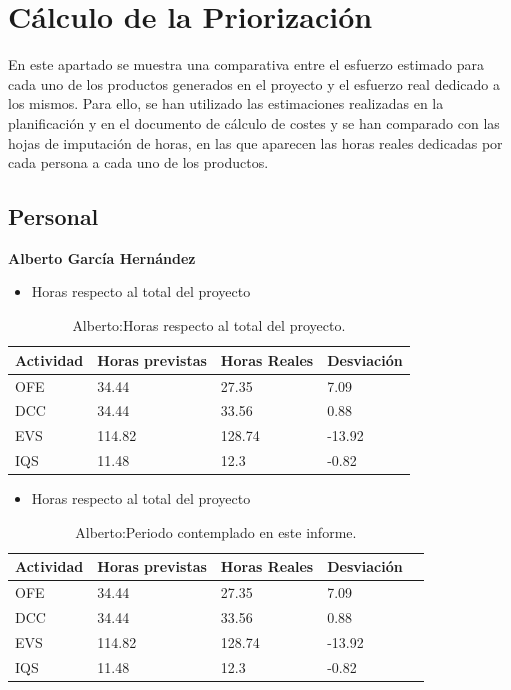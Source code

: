 \section{Cálculo de la Priorización}

\par En este apartado se muestra una comparativa entre el esfuerzo estimado para cada uno de los productos generados en el proyecto y el esfuerzo real dedicado a los mismos. Para ello, se han utilizado las estimaciones realizadas en la planificación y en el documento de cálculo de costes y se han comparado con las hojas de imputación de horas, en las que aparecen las horas reales dedicadas por cada persona a cada uno de los productos.

\subsection{Personal}

\textbf{Alberto García Hernández}
\begin{itemize}
\item Horas respecto al total del proyecto
\end{itemize}
\begin{table}[H]
\begin{center}
\begin{tabular}{ l l l l }
	Actividad & Horas previstas & Horas Reales & Desviación \\ \hline \hline
	 OFE & 34.44 & 27.35 & 7.09 \\ \hline
	 DCC & 34.44 & 33.56 & 0.88 \\ \hline
	 EVS & 114.82 & 128.74 & -13.92 \\ \hline
	 IQS & 11.48 & 12.3 & -0.82 \\ \hline
\end{tabular}
\caption{Alberto:Horas respecto al total del proyecto.}
\label{tab:Alberto:HorasTotalInforme}
\end{center}
\end{table}

\begin{itemize}
\item Horas respecto al total del proyecto
\end{itemize}
\begin{table}[H]
\begin{center}
\begin{tabular}{ l l l l l }
	 Actividad & Horas previstas & Horas Reales & Desviación \\ \hline \hline
	   OFE & 34.44 & 27.35 & 7.09 \\ \hline
	   DCC & 34.44 & 33.56 & 0.88 \\ \hline
	   EVS & 114.82 & 128.74 & -13.92 \\ \hline
	   IQS & 11.48 & 12.3 & -0.82 \\ \hline
\end{tabular}
\caption{Alberto:Periodo contemplado en este informe.}
\label{tab:Alberto:PeriodoContempladoInforme}
\end{center}
\end{table}


